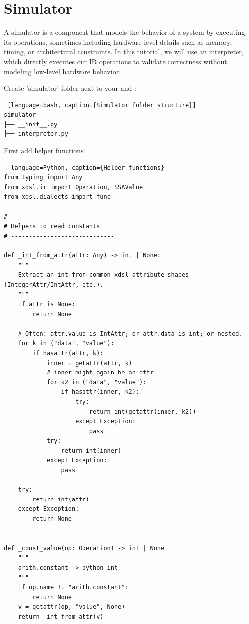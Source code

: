 \documentclass[../main.tex]{subfiles}
\begin{document}
\section{Simulator}
A simulator is a component that models the behavior of a system by executing its operations, sometimes including
hardware-level details such as memory, timing, or architectural constraints. In this tutorial, we will use an interpreter,
which directly executes our IR operations to validate correctness without modeling low-level hardware behavior.

Create 'simulator' folder next to your  and :
\begin{lstlisting} [language=bash, caption={Simulator folder structure}]
simulator
├── __init__.py
├── interpreter.py
\end{lstlisting}
First add helper functions:
\begin{lstlisting} [language=Python, caption={Helper functions}]
from typing import Any
from xdsl.ir import Operation, SSAValue
from xdsl.dialects import func

# -----------------------------
# Helpers to read constants
# -----------------------------

def _int_from_attr(attr: Any) -> int | None:
    """
    Extract an int from common xdsl attribute shapes (IntegerAttr/IntAttr, etc.).
    """
    if attr is None:
        return None

    # Often: attr.value is IntAttr; or attr.data is int; or nested.
    for k in ("data", "value"):
        if hasattr(attr, k):
            inner = getattr(attr, k)
            # inner might again be an attr
            for k2 in ("data", "value"):
                if hasattr(inner, k2):
                    try:
                        return int(getattr(inner, k2))
                    except Exception:
                        pass
            try:
                return int(inner)
            except Exception:
                pass

    try:
        return int(attr)
    except Exception:
        return None


def _const_value(op: Operation) -> int | None:
    """
    arith.constant -> python int
    """
    if op.name != "arith.constant":
        return None
    v = getattr(op, "value", None)
    return _int_from_attr(v)
\end{lstlisting}
\end{document}

